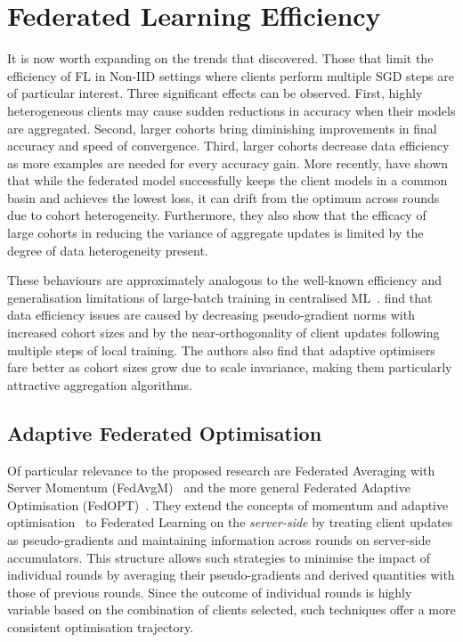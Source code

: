 \section{Federated Learning Efficiency}\label{sec:back:FL_Efficiency}
It is now worth expanding on the trends that \citet{LargeCohorts} discovered. Those that limit the efficiency of FL in Non-IID settings where clients perform multiple SGD steps are of particular interest. Three significant effects can be observed. First, highly heterogeneous clients may cause sudden reductions in accuracy when their models are aggregated. Second, larger cohorts bring diminishing improvements in final accuracy and speed of convergence. Third, larger cohorts decrease data efficiency as more examples are needed for every accuracy gain.  More recently, \citet{UnderstandingModelAveragingInFL} have shown that while the federated model successfully keeps the client models in a common basin and achieves the lowest loss, it can drift from the optimum across rounds due to cohort heterogeneity. Furthermore, they also show that the efficacy of large cohorts in reducing the variance of aggregate updates is limited by the degree of data heterogeneity present.

These behaviours are approximately analogous to the well-known efficiency and generalisation limitations of large-batch training in centralised ML~\citep{LargeBatchGenGapSharpMinima}. \citet{LargeCohorts} find that data efficiency issues are caused by decreasing pseudo-gradient norms with increased cohort sizes and by the near-orthogonality of client updates following multiple steps of local training. The authors also find that adaptive optimisers fare better as cohort sizes grow due to scale invariance, making them particularly attractive aggregation algorithms.

\subsection{Adaptive Federated Optimisation}

Of particular relevance to the proposed research are Federated Averaging with Server Momentum (FedAvgM)~\citep{FedAvgM} and the more general Federated Adaptive Optimisation (FedOPT)~\citep{FedOPT}. They extend the concepts of momentum and adaptive optimisation~\citep{AdaGrad,Adam,SgdAlgoOverview} to Federated Learning on the \textit{server-side} by treating client updates as pseudo-gradients and maintaining information across rounds on server-side accumulators. This structure allows such strategies to minimise the impact of individual rounds by averaging their pseudo-gradients and derived quantities with those of previous rounds. Since the outcome of individual rounds is highly variable based on the combination of clients selected, such techniques offer a more consistent optimisation trajectory.

